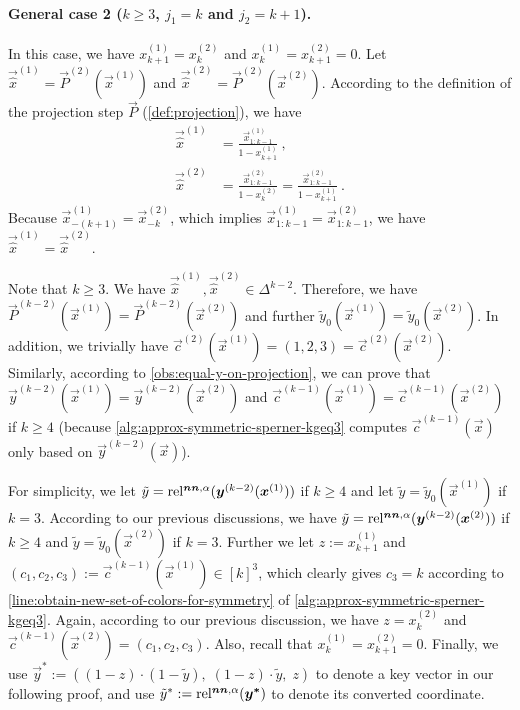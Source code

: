 \paragraph{General case 2 ($k\geq 3$, $j_1=k$ and $j_2=k+1$).} 
In this case, we have $x^{(1)}_{k+1}=x^{(2)}_{k}$ and $x^{(1)}_{k}=x^{(2)}_{k+1}=0$. 
Let $\vec{\hat{x}}^{(1)}=\vec{P}^{(2)}(\vec{x}^{(1)})$ and $\vec{\hat{x}}^{(2)}=\vec{P}^{(2)}(\vec{x}^{(2)})$. 
According to the definition of the projection step $\vec{P}$ (\cref{def:projection}), we have 
\begin{align*}
    \vec{\hat{x}}^{(1)}&=\frac{\vec{x}^{(1)}_{1:k-1}}{1-x^{(1)}_{k+1}}~,\\
    \vec{\hat{x}}^{(2)}&=\frac{\vec{x}^{(2)}_{1:k-1}}{1-x^{(2)}_{k}}=\frac{\vec{x}^{(2)}_{1:k-1}}{1-x^{(1)}_{k+1}}~.
\end{align*}
Because $\vec{x}^{(1)}_{-(k+1)}=\vec{x}^{(2)}_{-k}$, which implies $\vec{x}^{(1)}_{1:k-1}=\vec{x}^{(2)}_{1:k-1}$, we have $\vec{\hat{x}}^{(1)}=\vec{\hat{x}}^{(2)}$. 

Note that $k\geq 3$.
We have $\vec{\hat{x}}^{(1)}, \vec{\hat{x}}^{(2)}\in \Delta^{k-2}$.
Therefore, we have $\vec{P}^{(k-2)}(\vec{x}^{(1)})=\vec{P}^{(k-2)}(\vec{x}^{(2)})$ and further $\tilde{y}_0(\vec{x}^{(1)})=\tilde{y}_0(\vec{x}^{(2)})$. 
In addition, we trivially have $\vec{c}^{(2)}(\vec{x}^{(1)}) = (1,2,3) = \vec{c}^{(2)}(\vec{x}^{(2)})$. 
Similarly, according to \cref{obs:equal-y-on-projection}, we can prove that $\vec{y}^{(k-2)}(\vec{x}^{(1)})=\vec{y}^{(k-2)}(\vec{x}^{(2)})$ and $\vec{c}^{(k-1)}(\vec{x}^{(1)})=\vec{c}^{(k-1)}(\vec{x}^{(2)})$ if $k\geq 4$ (because \cref{alg:approx-symmetric-sperner-kgeq3} computes $\vec{c}^{(k-1)}(\vec{x})$ only based on $\vec{y}^{(k-2)}(\vec{x})$). 

For simplicity, we let $\tilde{y} = \operatorname*{rel^{\boldsymbol{nn},\alpha}}(\boldsymbol{y}^{(k-2)}(\boldsymbol{x}^{(1)}))$ if $k\geq 4$ and let $\tilde{y} = \tilde{y}_0(\vec{x}^{(1)})$ if $k=3$.
According to our previous discussions, we have $\tilde{y}=\operatorname*{rel^{\boldsymbol{nn},\alpha}}(\boldsymbol{y}^{(k-2)}(\boldsymbol{x}^{(2)}))$ if $k\geq 4$ and $\tilde{y} = \tilde{y}_0(\vec{x}^{(2)})$ if $k=3$.
Further we let $z:=x^{(1)}_{k+1}$ and $(c_1,c_2,c_3):=\vec{c}^{(k-1)}(\vec{x}^{(1)})\in [k]^{3}$, which clearly gives $c_3=k$ according to \cref{line:obtain-new-set-of-colors-for-symmetry} of \cref{alg:approx-symmetric-sperner-kgeq3}.  
Again, according to our previous discussion, we have $z=x^{(2)}_k$ and $\vec{c}^{(k-1)}(\vec{x}^{(2)})=(c_1,c_2,c_3)$. 
Also, recall that $x_{k}^{(1)}=x_{k+1}^{(2)}=0$.
Finally, we use $\vec{y}^*:=((1-z)\cdot (1-\tilde{y}),\; (1-z)\cdot \tilde{y},\; z)$ to denote a key vector in our following proof, and use $\tilde{y}^*:=\operatorname*{rel^{\boldsymbol{nn},\alpha}}(\boldsymbol{y^*})$ to denote its converted coordinate. 


